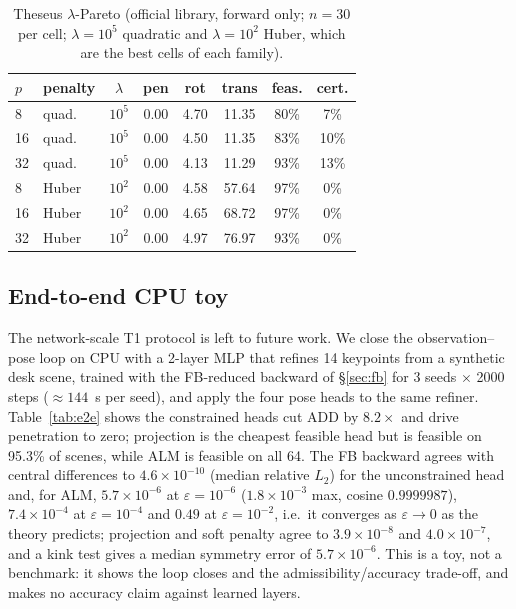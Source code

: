 \begin{table}[t]
\centering
\caption{Theseus $\lambda$-Pareto (official library, forward only; $n=30$ per cell; $\lambda=10^5$ quadratic and $\lambda=10^2$ Huber, which are the best cells of each family).}
\label{tab:theseus}
\scriptsize
\setlength{\tabcolsep}{2.4pt}
\begin{tabular}{@{}llcccccc@{}}
\toprule
$p$ & penalty & $\lambda$ & pen & rot & trans & feas. & cert. \\
\midrule
8 & quad. & $10^5$ & 0.00 & 4.70 & 11.35 & 80\% & 7\% \\
16 & quad. & $10^5$ & 0.00 & 4.50 & 11.35 & 83\% & 10\% \\
32 & quad. & $10^5$ & 0.00 & 4.13 & 11.29 & 93\% & 13\% \\
8 & Huber & $10^2$ & 0.00 & 4.58 & 57.64 & 97\% & 0\% \\
16 & Huber & $10^2$ & 0.00 & 4.65 & 68.72 & 97\% & 0\% \\
32 & Huber & $10^2$ & 0.00 & 4.97 & 76.97 & 93\% & 0\% \\
\bottomrule
\end{tabular}
\end{table}

\subsection{End-to-end CPU toy}\label{sec:e2e}
The network-scale T1 protocol is left to future work. We close the observation--pose loop on CPU with a 2-layer MLP that refines 14 keypoints from a synthetic desk scene, trained with the FB-reduced backward of \S\ref{sec:fb} for 3 seeds $\times$ 2000 steps ($\approx144$~s per seed), and apply the four pose heads to the same refiner. Table~\ref{tab:e2e} shows the constrained heads cut ADD by $8.2\times$ and drive penetration to zero; projection is the cheapest feasible head but is feasible on 95.3\% of scenes, while ALM is feasible on all 64. The FB backward agrees with central differences to $4.6\times10^{-10}$ (median relative $L_2$) for the unconstrained head and, for ALM, $5.7\times10^{-6}$ at $\varepsilon=10^{-6}$ ($1.8\times10^{-3}$ max, cosine $0.9999987$), $7.4\times10^{-4}$ at $\varepsilon=10^{-4}$ and $0.49$ at $\varepsilon=10^{-2}$, i.e.\ it converges as $\varepsilon\to0$ as the theory predicts; projection and soft penalty agree to $3.9\times10^{-8}$ and $4.0\times10^{-7}$, and a kink test gives a median symmetry error of $5.7\times10^{-6}$. This is a toy, not a benchmark: it shows the loop closes and the admissibility/accuracy trade-off, and makes no accuracy claim against learned layers.

